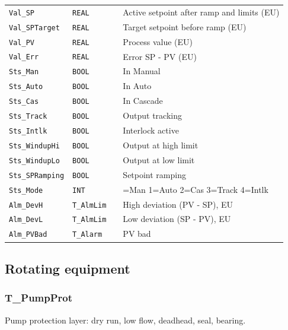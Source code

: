 {\begin{longtable}{@{}>{\raggedright\arraybackslash}p{3.4cm}>{\raggedright\arraybackslash}p{3.3cm}>{\raggedright\arraybackslash}p{1.3cm}>{\raggedright\arraybackslash}p{6.4cm}@{}}
\texttt{Val\_SP} & \texttt{REAL} &  & Active setpoint after ramp and limits (EU) \\
\texttt{Val\_SPTarget} & \texttt{REAL} &  & Target setpoint before ramp (EU) \\
\texttt{Val\_PV} & \texttt{REAL} &  & Process value (EU) \\
\texttt{Val\_Err} & \texttt{REAL} &  & Error SP - PV (EU) \\
\texttt{Sts\_Man} & \texttt{BOOL} &  & In Manual \\
\texttt{Sts\_Auto} & \texttt{BOOL} &  & In Auto \\
\texttt{Sts\_Cas} & \texttt{BOOL} &  & In Cascade \\
\texttt{Sts\_Track} & \texttt{BOOL} &  & Output tracking \\
\texttt{Sts\_Intlk} & \texttt{BOOL} &  & Interlock active \\
\texttt{Sts\_WindupHi} & \texttt{BOOL} &  & Output at high limit \\
\texttt{Sts\_WindupLo} & \texttt{BOOL} &  & Output at low limit \\
\texttt{Sts\_SPRamping} & \texttt{BOOL} &  & Setpoint ramping \\
\texttt{Sts\_Mode} & \texttt{INT} &  & 0=Man 1=Auto 2=Cas 3=Track 4=Intlk \\
\texttt{Alm\_DevH} & \texttt{T\_AlmLim} &  & High deviation (PV - SP), EU \\
\texttt{Alm\_DevL} & \texttt{T\_AlmLim} &  & Low deviation (SP - PV), EU \\
\texttt{Alm\_PVBad} & \texttt{T\_Alarm} &  & PV bad \\
\bottomrule
\end{longtable}
}
\subsection{Rotating equipment}
\subsubsection*{T\_PumpProt}
\label{app:pclib:tpumpprot}
Pump protection layer: dry run, low flow, deadhead, seal, bearing.

